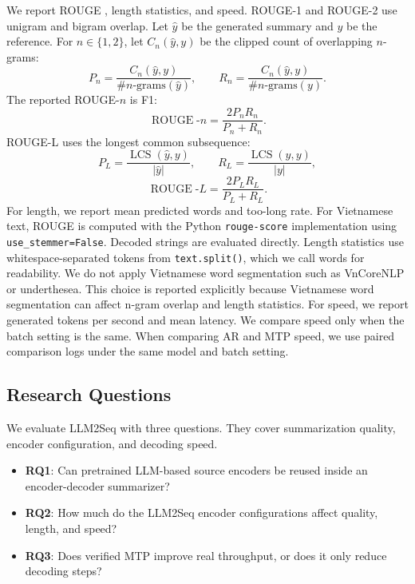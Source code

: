 \documentclass[11pt]{article}
\begin{document}
We report ROUGE \citep{lin2004rouge}, length statistics, and speed.
ROUGE-1 and ROUGE-2 use unigram and bigram overlap.
Let $\hat{y}$ be the generated summary and $y$ be the reference.
For $n\in\{1,2\}$, let $C_n(\hat{y},y)$ be the clipped count of overlapping $n$-grams:
\begin{equation}
P_n=\frac{C_n(\hat{y},y)}{\#n\text{-grams}(\hat{y})},
\qquad
R_n=\frac{C_n(\hat{y},y)}{\#n\text{-grams}(y)}.
\end{equation}
The reported ROUGE-$n$ is F1:
\begin{equation}
\operatorname{ROUGE}\text{-}n
=\frac{2P_nR_n}{P_n+R_n}.
\end{equation}
ROUGE-L uses the longest common subsequence:
\begin{equation}
P_L=\frac{\operatorname{LCS}(\hat{y},y)}{|\hat{y}|},
\qquad
R_L=\frac{\operatorname{LCS}(\hat{y},y)}{|y|},
\end{equation}
\begin{equation}
\operatorname{ROUGE}\text{-}L
=\frac{2P_LR_L}{P_L+R_L}.
\end{equation}
For length, we report mean predicted words and too-long rate.
For Vietnamese text, ROUGE is computed with the Python \texttt{rouge-score} implementation using \texttt{use\_stemmer=False}.
Decoded strings are evaluated directly.
Length statistics use whitespace-separated tokens from \texttt{text.split()}, which we call words for readability.
We do not apply Vietnamese word segmentation such as VnCoreNLP or underthesea.
This choice is reported explicitly because Vietnamese word segmentation can affect n-gram overlap and length statistics.
For speed, we report generated tokens per second and mean latency.
We compare speed only when the batch setting is the same.
When comparing AR and MTP speed, we use paired comparison logs under the same model and batch setting.

\subsection{Research Questions}

We evaluate LLM2Seq with three questions.
They cover summarization quality, encoder configuration, and decoding speed.
\begin{itemize}
    \item \textbf{RQ1}: Can pretrained LLM-based source encoders be reused inside an encoder-decoder summarizer?
    \item \textbf{RQ2}: How much do the LLM2Seq encoder configurations affect quality, length, and speed?
    \item \textbf{RQ3}: Does verified MTP improve real throughput, or does it only reduce decoding steps?
\end{itemize}
\end{document}
